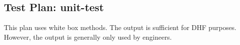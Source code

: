 \subsection{Test Plan: unit-test}
\begin{description}[align=right,leftmargin=*,labelindent=3cm]
\item[Purpose:] This plan uses white box methods.  The output is sufficient for DHF purposes.  However, the output is generally only used by engineers. 

\end{description}
